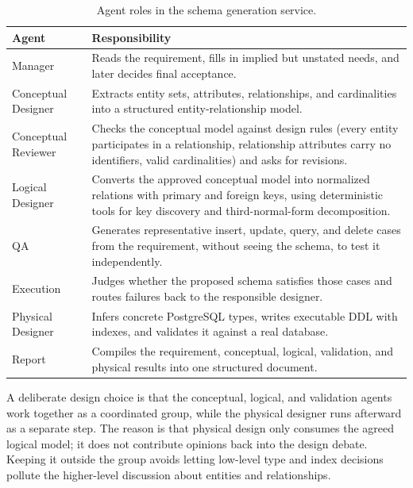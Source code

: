 \begin{table}[H]
    \centering
    \small
    \renewcommand{\arraystretch}{1.3}
    \begin{tabularx}{\textwidth}{|>{\RaggedRight\arraybackslash}p{3.4cm}|>{\RaggedRight\arraybackslash}X|}
    \hline
    \textbf{Agent} & \textbf{Responsibility} \\
    \hline
    Manager & Reads the requirement, fills in implied but unstated needs, and later decides final acceptance. \\
    \hline
    Conceptual Designer & Extracts entity sets, attributes, relationships, and cardinalities into a structured entity-relationship model. \\
    \hline
    Conceptual Reviewer & Checks the conceptual model against design rules (every entity participates in a relationship, relationship attributes carry no identifiers, valid cardinalities) and asks for revisions. \\
    \hline
    Logical Designer & Converts the approved conceptual model into normalized relations with primary and foreign keys, using deterministic tools for key discovery and third-normal-form decomposition. \\
    \hline
    QA & Generates representative insert, update, query, and delete cases from the requirement, without seeing the schema, to test it independently. \\
    \hline
    Execution & Judges whether the proposed schema satisfies those cases and routes failures back to the responsible designer. \\
    \hline
    Physical Designer & Infers concrete PostgreSQL types, writes executable DDL with indexes, and validates it against a real database. \\
    \hline
    Report & Compiles the requirement, conceptual, logical, validation, and physical results into one structured document. \\
    \hline
    \end{tabularx}
    \caption{Agent roles in the schema generation service.}
    \label{tab:schema_agents}
\end{table}

A deliberate design choice is that the conceptual, logical, and validation agents work together as a coordinated group, while the physical designer runs afterward as a separate step. The reason is that physical design only consumes the agreed logical model; it does not contribute opinions back into the design debate. Keeping it outside the group avoids letting low-level type and index decisions pollute the higher-level discussion about entities and relationships.

